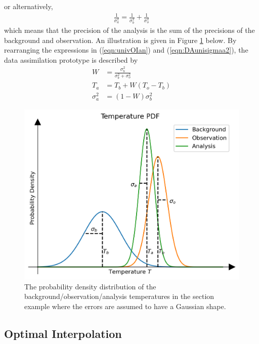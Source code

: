 or alternatively,
\begin{align}
\frac{1}{\sigma_a^2} = \frac{1}{\sigma_b^2} + \frac{1}{\sigma_o^2}
\end{align}
which means that the precision of the analysis is the sum of the precisions of
the background and observation. An illustration is given in Figure \ref{fig:DA1} below. By rearranging the expressions in (\ref{eqn:univOIan}) and (\ref{eqn:DAunisigmaa2}), the data assimilation prototype is described by
\begin{subequations}
\label{eqn:univOIschm}
\begin{align}
W &= \frac{\sigma_b^2}{\sigma_b^2 + \sigma_o^2}\\  
T_a &= T_b + W(T_o - T_b) \label{eqn:uniDAweight} \\
\sigma_a^2 &= (1 - W)\sigma_b^2
\end{align}    
\end{subequations}

\begin{figure}[ht!]
    \centering
    \includegraphics[scale=0.75]{graphics/DA1.png}
    \caption{The probability density distribution of the background/observation/analysis temperatures in the section example where the errors are assumed to have a Gaussian shape.}
    \label{fig:DA1}
\end{figure}

\subsection{Optimal Interpolation}

